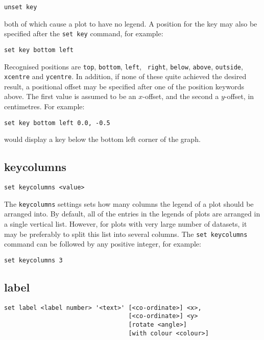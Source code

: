 \begin{verbatim}
unset key
\end{verbatim}

\noindent both of which cause a plot to have no legend. A position for the key may also
be specified after the {\tt set key} command, for example:

\begin{verbatim}
set key bottom left
\end{verbatim}

Recognised positions are {\tt top}, {\tt bottom}, {\tt left}, {\tt
right}, {\tt below}, {\tt above}, {\tt outside}, {\tt xcentre} and
{\tt ycentre}. In addition, if none of these quite achieved the desired
result, a positional offset may be specified after one of the position keywords
above.  The first value is assumed to be an $x$-offset, and the second a
$y$-offset, in centimetres.  For example:

\begin{verbatim}
set key bottom left 0.0, -0.5
\end{verbatim}

\noindent would display a key below the bottom left corner of the graph.


\subsection{keycolumns}

\begin{verbatim}
set keycolumns <value>
\end{verbatim}

The {\tt keycolumns} settings sets how many columns the legend of a plot should
be arranged into. By default, all of the entries in the legends of plots are
arranged in a single vertical list. However, for plots with very large number
of datasets, it may be preferably to split this list into several columns. The
{\tt set keycolumns} command can be followed by any positive integer, for
example:

\begin{verbatim}
set keycolumns 3
\end{verbatim}


\subsection{label}

\begin{verbatim}
set label <label number> '<text>' [<co-ordinate>] <x>,
                                  [<co-ordinate>] <y>
                                  [rotate <angle>]
                                  [with colour <colour>]
\end{verbatim}

